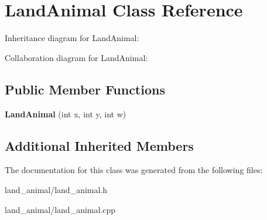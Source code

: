 \hypertarget{classLandAnimal}{}\section{Land\+Animal Class Reference}
\label{classLandAnimal}


Inheritance diagram for Land\+Animal\+:


Collaboration diagram for Land\+Animal\+:
\subsection*{Public Member Functions}
\begin{DoxyCompactItemize}
\item 
{\bfseries Land\+Animal} (int x, int y, int w)\hypertarget{classLandAnimal_a7225e8dc7b49181659b4e916e471ed23}{}\label{classLandAnimal_a7225e8dc7b49181659b4e916e471ed23}

\end{DoxyCompactItemize}
\subsection*{Additional Inherited Members}


The documentation for this class was generated from the following files\+:\begin{DoxyCompactItemize}
\item 
land\+\_\+animal/land\+\_\+animal.\+h\item 
land\+\_\+animal/land\+\_\+animal.\+cpp\end{DoxyCompactItemize}
